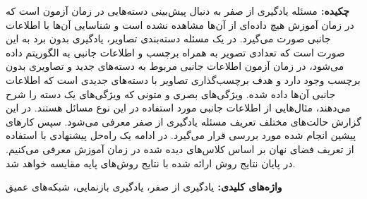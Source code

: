 {\bf {چکيده: }}
مسئله یادگیری از صفر
به دنبال پیش‌بینی دسته‌هایی در زمان آزمون است که در زمان آموزش هیچ داده‌ای از آن‌ها مشاهده نشده است و شناسایی آن‌ها با اطلاعات جانبی صورت می‌گیرد. در یک مسئله دسته‌بندی تصاویر، یادگیری بدون برد به این صورت است که تعدادی تصویر به همراه برچسب و اطلاعات جانبی به الگوریتم داده می‌شود، در زمان آزمون  اطلاعات جانبی مربوط به دسته‌های جدید و تصاویری بدون برچسب وجود دارد و هدف برچسب‌گذاری تصاویر با دسته‌های جدیدی است که اطلاعات جانبی آن‌ها داده شده. ویژگی‌های بصری و متونی که ویژگی‌های یک دسته را شرح می‌دهند، مثال‌هایی از اطلاعات جانبی مورد استفاده در این نوع مسائل هستند. 
در این گزارش حالت‌های مختلف تعریف مسئله یادگیری از صفر معرفی می‌شود. سپس کارهای پیشین انجام شده مورد بررسی قرار می‌گیرد. در ادامه یک راه‌حل پیشنهادی با استفاده از تعریف فضای نهان بر اساس کلاس‌های دیده شده در زمان آموزش معرفی می‌کنیم. در پایان نتایج روش ارائه شده با نتایج روش‌های پایه مقایسه خواهد شد.

{\bf  { واژه‌های کلیدی: }}
یادگیری از صفر، یادگیری بازنمایی، شبکه‌های عمیق

